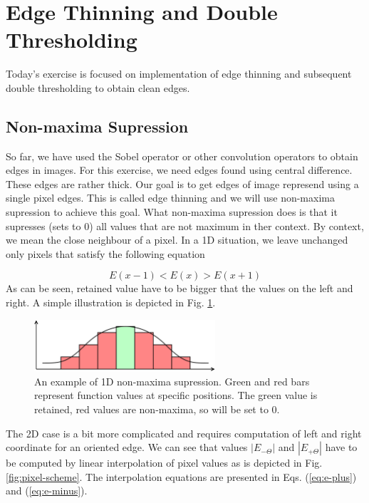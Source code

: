 \documentclass[12pt]{article}
\begin{document}
\section*{Edge Thinning and Double Thresholding}

Today's exercise is focused on implementation of edge thinning and subsequent double thresholding to obtain clean edges.

\subsection*{Non-maxima Supression}

So far, we have used the Sobel operator or other convolution operators to obtain edges in images.
For this exercise, we need edges found using central difference.
These edges are rather thick.
Our goal is to get edges of image represend using a single pixel edges.
This is called edge thinning and we will use non-maxima supression to achieve this goal.
What non-maxima supression does is that it supresses (sets to $0$) all values that are not maximum in ther context.
By context, we mean the close neighbour of a pixel.
In a 1D situation, we leave unchanged only pixels that satisfy the following equation

\begin{equation} \label{eq:max_1d}
    E(x - 1) < E(x) > E(x + 1)
\end{equation}
As can be seen, retained value have to be bigger that the values on the left and right.
A simple illustration is depicted in Fig. \ref{fig:non-maxima-supression-1d}.

\begin{figure}[h]
\begin{centering}
    \includegraphics[width=0.6\textwidth]{non_maxima_supression_1d}
    \caption{An example of 1D non-maxima supression. Green and red bars represent function values at specific positions. The green value is retained, red values are non-maxima, so will be set to 0.}
    \label{fig:non-maxima-supression-1d}
\end{centering}
\end{figure}

\noindent
The 2D case is a bit more complicated and requires computation of left and right coordinate for an oriented edge.
We can see that values $|E_{-\Theta}|$ and $|E_{+\Theta}|$ have to be computed by linear interpolation of pixel values as is depicted in Fig. \ref{fig:pixel-scheme}.
The interpolation equations are presented in Eqs. (\ref{eq:e-plus}) and (\ref{eq:e-minus}).
\end{document}

